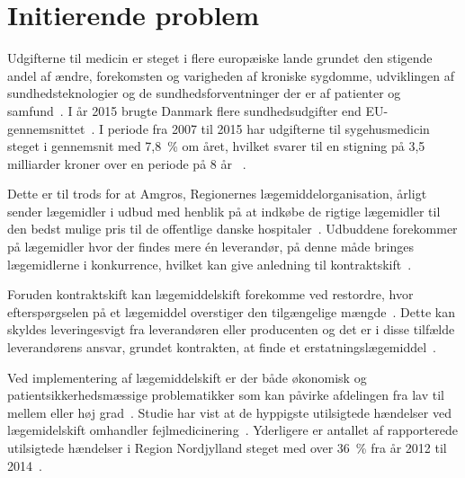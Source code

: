 \chapter{Initierende problem}
Udgifterne til medicin er steget i flere europæiske lande grundet den stigende andel af ændre, forekomsten og varigheden af kroniske sygdomme, udviklingen af sundhedsteknologier og de sundhedsforventninger der er af patienter og samfund~\citep{Ess2003}. I år 2015 brugte Danmark flere sundhedsudgifter end EU-gennemsnittet~\citep{EU2017}. I periode fra 2007 til 2015 har udgifterne til sygehusmedicin steget i gennemsnit med 7,8~\% om året, hvilket svarer til en stigning på 3,5 milliarder kroner over en periode på 8 år ~\citep{Sundhed2016}.



Dette er til trods for at Amgros, Regionernes lægemiddelorganisation, årligt sender lægemidler i udbud med henblik på at indkøbe de rigtige lægemidler til den bedst mulige pris til de offentlige danske hospitaler~\citep{Sygehusapoteket2017}. Udbuddene forekommer på lægemidler hvor der findes mere én leverandør, på denne måde bringes lægemidlerne i konkurrence, hvilket kan give anledning til kontraktskift~\citep{Amgros2015}.

Foruden kontraktskift kan lægemiddelskift forekomme ved restordre, hvor efterspørgselen på et lægemiddel overstiger den tilgængelige mængde~\citep{Amgros2015}. Dette kan skyldes leveringesvigt fra leverandøren eller producenten og det er i disse tilfælde leverandørens ansvar, grundet kontrakten, at finde et erstatningslægemiddel~\citep{Laegemiddelinformaion2017, Amgros2017}. 

Ved implementering af lægemiddelskift er der både økonomisk og patientsikkerhedsmæssige problematikker som kan påvirke afdelingen fra lav til mellem eller høj grad~\citep{Laegemiddelinformaion2017, Sygehusapoteket2017a}. Studie har vist at de hyppigste utilsigtede hændelser ved lægemidelskift omhandler fejlmedicinering~\citep{Hakonsen2010}. Yderligere er antallet af rapporterede utilsigtede hændelser i Region Nordjylland steget med over 36~\% fra år 2012 til 2014~\citep{Jensen2014}.
